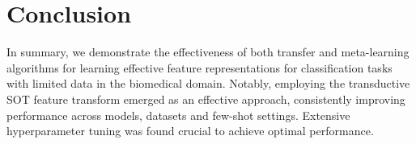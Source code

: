 \section{Conclusion}

In summary, we demonstrate the effectiveness of both transfer and meta-learning algorithms for learning effective feature representations for classification tasks with limited data in the biomedical domain. 
Notably, employing the transductive SOT feature transform emerged as an effective approach, consistently improving performance across models, datasets and few-shot settings. Extensive hyperparameter tuning was found crucial to achieve optimal performance.